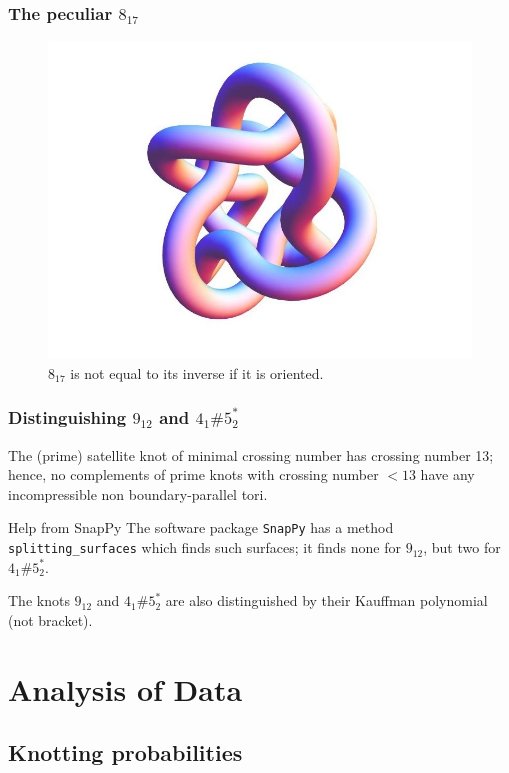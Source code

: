 \documentclass[presentation]{beamer}
\begin{document}
\begin{frame}
  \frametitle{The peculiar $8_{17}$}
  \begin{figure}
    \centering
    \includegraphics[height=.7\textheight,keepaspectratio]{8_17_3d.jpg}
    \caption{$8_{17}$ is not equal to its inverse if it is oriented.}
    \label{fig:8_17}
  \end{figure}
\end{frame}

\begin{frame}
  \frametitle{Distinguishing $9_{12}$ and $4_1 \# 5_2^*$}
  The (prime) satellite knot of minimal crossing number has crossing
  number 13; hence, no complements of prime knots with crossing number
  $<13$ have any incompressible non boundary-parallel tori.

  \begin{block}{Help from SnapPy}
    The software package \texttt{SnapPy} has a method
    \texttt{splitting\_surfaces} which finds such surfaces; it finds
    none for $9_{12}$, but two for $4_1 \# 5_2^*$.
  \end{block}
  The knots $9_{12}$ and $4_1 \# 5_2^*$ are also distinguished by
  their Kauffman polynomial (not bracket).
\end{frame}

\section{Analysis of Data}
\label{sec:data}

\subsection{Knotting probabilities}
\end{document}
